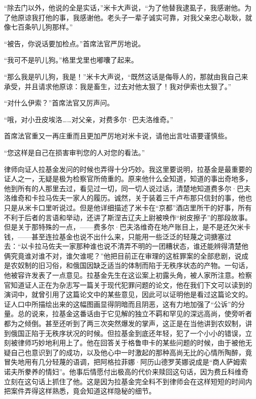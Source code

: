 \par “除去门以外，他说的全是实话，”米卡大声说，“为了他替我逮虱子，我感谢他。为了他原谅我打他的事，我感谢他。老头子一辈子诚实可靠，对我父亲忠心耿耿，就像七百条叭儿狗那样。”
\par “被告，你说话要加检点。”首席法官严厉地说。
\par “我可不是叭儿狗。”格里戈里也嘟囔了起来。
\par “那么我是叭儿狗，我是！”米卡大声说，“既然这话是侮辱人的，那就由我自己来承受，并且请求他原谅：我是畜生，过去对他太狠了！我对伊索也太狠了。”
\par “对什么伊索？”首席法官又厉声问。
\par “哦，对小丑皮埃洛……对父亲，对费多尔·巴夫洛维奇。”
\par 首席法官重又一再庄重而且更加严厉地对米卡说，请他出言吐语要谨慎些。
\par “您这样是自己在损害审判您的人对您的看法。”
\par 律师向证人拉基金发问的时候也弄得十分巧妙。我这里要说明，拉基金是最重要的证人之一，无疑是极为检察官所倚重的。原来他什么全知道，知道的事出奇地多，他到所有的人那里去过，看见过一切，同一切人说过话，清楚地知道费多尔·巴夫洛维奇和卡拉马佐夫一家人的履历。诚然，关于装着三千卢布那只信封的事，他也只是从米卡口里听说过。但是他详细描述了米卡在“京都”酒店里所干的好事，所有不利于后者的言语和举动，还讲了斯涅吉辽夫上尉被唤作“树皮擦子”的那段故事。但是关于那特殊的一点，——费多尔·巴夫洛维奇在地产账目上，是不是还欠米卡钱，——甚至连拉基金也说不出什么来，只能用一些泛泛的轻蔑之词搪塞过去：“以卡拉马佐夫一家那种谁也说不清弄不明的一团糟状态，谁还能辨得清楚他俩究竟谁对谁不对，谁欠谁呢？”他把目前正在审理的这桩罪案的全部悲剧，说成是农奴制的旧习俗，和俄国因缺乏适当的体制而陷于无秩序状态的产物。一句话，他被容许发表了一点意见。拉基金先生在这讼案上初露头角，被人家所注意。检察官知道证人正在为杂志写一篇关于现代犯罪问题的论文，他在我们下文可以读到的演词中，就曾引用了这篇论文中的某些意见，因此可以证明他是看过这篇论文的。证人口中所描绘出来的这幅图画显得阴暗而且阴恶，这有力地加强了“公诉”的分量。总的说来，拉基金这番话由于它见解的独立不羁和罕见的深远高尚，使旁听者都为之倾倒。甚至还听到了两三次突然爆发的掌声，这正是在当他讲到农奴制，讲到俄国正陷于无秩序状况的时候。但拉基金到底还年轻，犯了一个小小的错误，立刻被律师巧妙地利用上了。他在回答关于格鲁申卡的某些问题的时候，由于被他无疑自己也意识到了的成功，以及他心中一时激起的那种高尚无比的心情所陶醉，竟冒失地用有几分轻蔑的语调，把阿格拉菲娜·阿历山德罗芙娜说成是“商人萨姆索诺夫所豢养的情妇”。他事后情愿付出极高的代价来赎回这句话，因为费丘科维奇立刻在这句话上抓住了他。这是因为拉基金完全料不到律师会在这样短短的时间内把案件弄得这样熟悉，竟会知道这样隐秘的细节。
